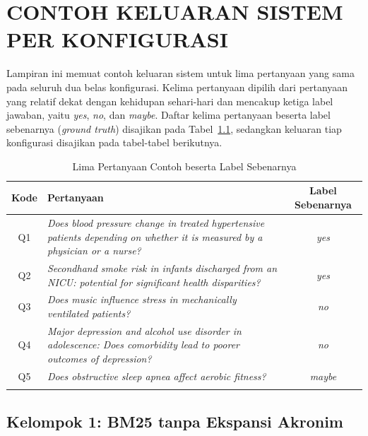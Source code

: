 \cleardoublepage
\chapter{CONTOH KELUARAN SISTEM PER KONFIGURASI}
\label{lamp:contoh-keluaran}

Lampiran ini memuat contoh keluaran sistem untuk lima pertanyaan yang sama pada seluruh dua belas konfigurasi. Kelima pertanyaan dipilih dari pertanyaan yang relatif dekat dengan kehidupan sehari-hari dan mencakup ketiga label jawaban, yaitu \textit{yes}, \textit{no}, dan \textit{maybe}. Daftar kelima pertanyaan beserta label sebenarnya (\textit{ground truth}) disajikan pada Tabel~\ref{tbl:contoh-pertanyaan}, sedangkan keluaran tiap konfigurasi disajikan pada tabel-tabel berikutnya.

\begin{table}[H]
\centering\footnotesize\setlength{\tabcolsep}{5pt}
\caption{Lima Pertanyaan Contoh beserta Label Sebenarnya}
\label{tbl:contoh-pertanyaan}
\begin{tabular}{c >{\raggedright\arraybackslash}p{10.5cm} c}
\toprule
\textbf{Kode} & \textbf{Pertanyaan} & \textbf{Label Sebenarnya} \\
\midrule
Q1 & \textit{Does blood pressure change in treated hypertensive patients depending on whether it is measured by a physician or a nurse?} & \textit{yes} \\
\addlinespace
Q2 & \textit{Secondhand smoke risk in infants discharged from an NICU: potential for significant health disparities?} & \textit{yes} \\
\addlinespace
Q3 & \textit{Does music influence stress in mechanically ventilated patients?} & \textit{no} \\
\addlinespace
Q4 & \textit{Major depression and alcohol use disorder in adolescence: Does comorbidity lead to poorer outcomes of depression?} & \textit{no} \\
\addlinespace
Q5 & \textit{Does obstructive sleep apnea affect aerobic fitness?} & \textit{maybe} \\
\addlinespace
\bottomrule
\end{tabular}
\end{table}

\section{Kelompok 1: BM25 tanpa Ekspansi Akronim}

